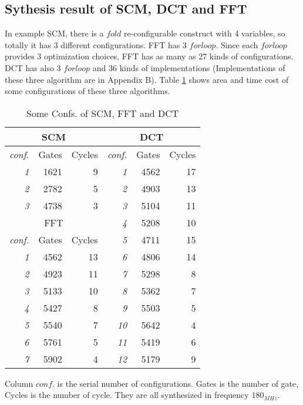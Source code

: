 \subsection{Sythesis result of SCM, DCT and FFT}
In example SCM, there is a $fold$ re-configurable construct with 4 variables, so totally it has 3 different configurations. FFT has 3 $forloop$. Since each $forloop$ provides 3 optimization choices, FFT has as many as 27 kinds of configurations. DCT has also 3 $forloop$ and 36 kinds of implementations (Implementations of these three algorithm are in Appendix B).
Table \ref{table:confs} shows area and time cost of some configurations of these three algorithms.
\begin{table}[h]
\centering
\caption{Some Confs. of SCM, FFT and DCT}
\begin{tabular}{|r|rr|r|rr|} \hline
\multicolumn{3}{|c|}{SCM} & \multicolumn{3}{c|}{DCT} \\ \hline
\textit{conf.} & Gates & Cycles & \textit{conf.} & Gates & Cycles \\ \hline
\textit{1} & 1621 & 9 & \textit{1} & 4562 & 17 \\
\textit{2} & 2782 & 5 & \textit{2} & 4903 & 13 \\
\textit{3} & 4738 & 3 & \textit{3} & 5104 & 11 \\ \cline{1-3}
\multicolumn{3}{|c|}{FFT} & \textit{4} & 5208 & 10 \\ \cline{1-3}
\textit{conf.} & Gates & Cycles & \textit{5} & 4711 & 15 \\ \cline{1-3}
\textit{1} & 4562 & 13 & \textit{6} & 4806 & 14 \\
\textit{2} & 4923 & 11 & \textit{7} & 5298 & 8 \\
\textit{3} & 5133 & 10 & \textit{8} & 5362 & 7 \\
\textit{4} & 5427 & 8 & \textit{9} & 5503 & 5 \\
\textit{5} & 5540 & 7 & \textit{10} & 5642 & 4 \\
\textit{6} & 5761 & 5 & \textit{11} & 5419 & 6 \\
\textit{7} & 5902 & 4 & \textit{12} & 5179 & 9 \\ \hline
\end{tabular}
\label{table:confs}
\end{table}
Column $conf.$ is the serial number of configurations. Gates is the number of gate, Cycles is the number of cycle. They are all synthesized in frequency $180_{MHz}$.
